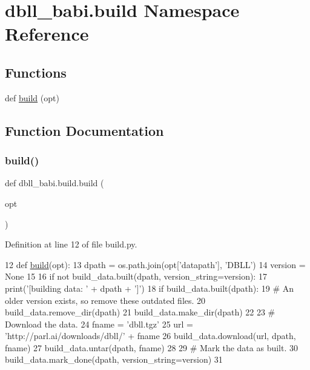 \hypertarget{namespacedbll__babi_1_1build}{}\section{dbll\+\_\+babi.\+build Namespace Reference}
\label{namespacedbll__babi_1_1build}
\subsection*{Functions}
\begin{DoxyCompactItemize}
\item 
def \hyperlink{namespacedbll__babi_1_1build_a841db6f39b42d47e268ec9a6d4e05458}{build} (opt)
\end{DoxyCompactItemize}


\subsection{Function Documentation}
\mbox{\label{namespacedbll__babi_1_1build_a841db6f39b42d47e268ec9a6d4e05458}} 
\subsubsection{\texorpdfstring{build()}{build()}}
{\footnotesize\ttfamily def dbll\+\_\+babi.\+build.\+build (\begin{DoxyParamCaption}\item[{}]{opt }\end{DoxyParamCaption})}



Definition at line 12 of file build.\+py.


\begin{DoxyCode}
12 \textcolor{keyword}{def }\hyperlink{namespacedialog__babi__feedback_1_1build_a7a9d289f7493a5ded13c4b7f071b6184}{build}(opt):
13     dpath = os.path.join(opt[\textcolor{stringliteral}{'datapath'}], \textcolor{stringliteral}{'DBLL'})
14     version = \textcolor{keywordtype}{None}
15 
16     \textcolor{keywordflow}{if} \textcolor{keywordflow}{not} build\_data.built(dpath, version\_string=version):
17         print(\textcolor{stringliteral}{'[building data: '} + dpath + \textcolor{stringliteral}{']'})
18         \textcolor{keywordflow}{if} build\_data.built(dpath):
19             \textcolor{comment}{# An older version exists, so remove these outdated files.}
20             build\_data.remove\_dir(dpath)
21         build\_data.make\_dir(dpath)
22 
23         \textcolor{comment}{# Download the data.}
24         fname = \textcolor{stringliteral}{'dbll.tgz'}
25         url = \textcolor{stringliteral}{'http://parl.ai/downloads/dbll/'} + fname
26         build\_data.download(url, dpath, fname)
27         build\_data.untar(dpath, fname)
28 
29         \textcolor{comment}{# Mark the data as built.}
30         build\_data.mark\_done(dpath, version\_string=version)
31 \end{DoxyCode}
